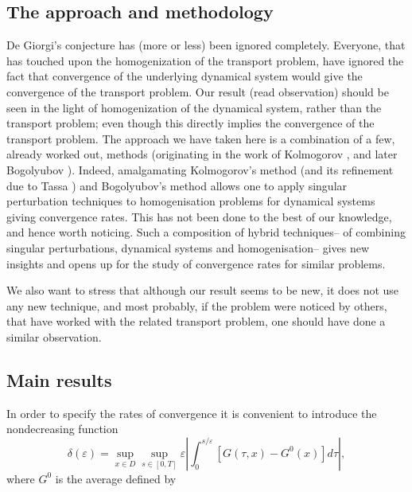 \documentclass[10pt]{amsart}
\theoremstyle{definition}                                                                                  \newtheorem{remark}[theorem]{Remark}
\theoremstyle{theorem}
\begin{document}
\subsection{The approach and methodology}

 De Giorgi's conjecture has (more or less)  been ignored completely. 
 Everyone, that has touched upon the homogenization of the transport problem, have ignored the fact that convergence of the underlying dynamical system would give the 
convergence of the transport problem.  Our result (read observation) should be seen in the light of  homogenization of the dynamical system,
 rather than the transport problem; even though this directly implies the convergence of the transport problem. 
The approach we have taken here is a combination of a few, already worked out, methods (originating in the work of Kolmogorov \cite{Kolm53}, and later Bogolyubov \cite{Bogolyubov} ). Indeed,  amalgamating   Kolmogorov's method (and its refinement due to Tassa \cite{Tassa}) and Bogolyubov's method
allows one to apply singular perturbation techniques to homogenisation problems for dynamical systems giving convergence rates. This has not been done to the best of our knowledge, and hence worth noticing.
Such a   composition of hybrid techniques-- of combining singular perturbations, dynamical systems and homogenisation--  
gives new insights and opens up for the study of convergence rates for similar problems. 

We also want to stress that although our result seems to be new,   it does not use any new technique, and most probably, if the problem were noticed by others, that have worked with the related transport problem, one should have done a similar observation.

\medskip

\subsection{Main results}
In order to specify  the rates of convergence it is convenient to introduce the nondecreasing function
\begin{equation}\label{delta}
\delta({\varepsilon})=\sup_{x\in D}\sup_{s\in[0,T]}
{\varepsilon}\left|\int_0^{s/{\varepsilon}}[G(\tau, x)-G^0(x)]d\tau\right|,
\end{equation}
where $G^0$ is the average defined by 
\end{document}
